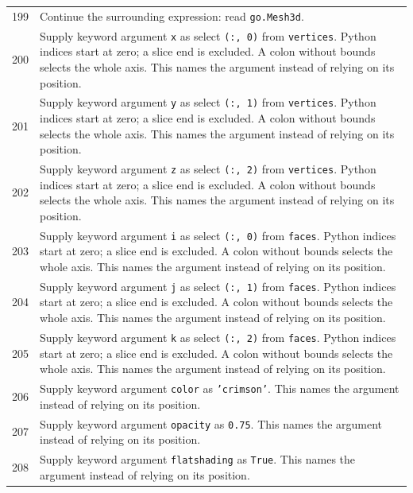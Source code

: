 \documentclass[11pt,a4paper]{book}
\begin{document}
\begin{longtable}{r p{}}
199 & Continue the surrounding expression: read \texttt{go.Mesh3d}. \\

200 & Supply keyword argument \texttt{x} as select \texttt{(:, 0)} from \texttt{vertices}. Python indices start at zero; a slice end is excluded. A colon without bounds selects the whole axis. This names the argument instead of relying on its position. \\

201 & Supply keyword argument \texttt{y} as select \texttt{(:, 1)} from \texttt{vertices}. Python indices start at zero; a slice end is excluded. A colon without bounds selects the whole axis. This names the argument instead of relying on its position. \\

202 & Supply keyword argument \texttt{z} as select \texttt{(:, 2)} from \texttt{vertices}. Python indices start at zero; a slice end is excluded. A colon without bounds selects the whole axis. This names the argument instead of relying on its position. \\

203 & Supply keyword argument \texttt{i} as select \texttt{(:, 0)} from \texttt{faces}. Python indices start at zero; a slice end is excluded. A colon without bounds selects the whole axis. This names the argument instead of relying on its position. \\

204 & Supply keyword argument \texttt{j} as select \texttt{(:, 1)} from \texttt{faces}. Python indices start at zero; a slice end is excluded. A colon without bounds selects the whole axis. This names the argument instead of relying on its position. \\

205 & Supply keyword argument \texttt{k} as select \texttt{(:, 2)} from \texttt{faces}. Python indices start at zero; a slice end is excluded. A colon without bounds selects the whole axis. This names the argument instead of relying on its position. \\

206 & Supply keyword argument \texttt{color} as \texttt{'crimson'}. This names the argument instead of relying on its position. \\

207 & Supply keyword argument \texttt{opacity} as \texttt{0.75}. This names the argument instead of relying on its position. \\

208 & Supply keyword argument \texttt{flatshading} as \texttt{True}. This names the argument instead of relying on its position. \\


\end{longtable}
\end{document}
